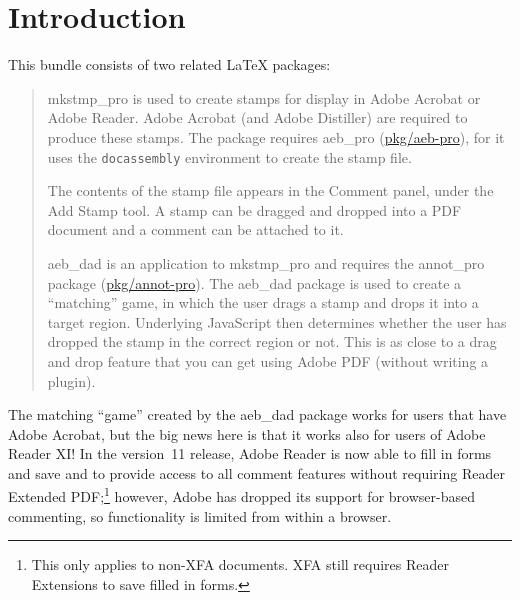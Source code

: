 \documentclass{article}
\def\pkg{\textsf}
\let\app\textsf
\begin{document}
\maketitle

\tableofcontents
{}

\section{Introduction}

This bundle consists of two related {\LaTeX} packages:
\begin{quote}
\begin{description}
    \item \pkg{mkstmp\_pro} is used to create stamps for display in
        \app{Adobe Acrobat} or \app{Adobe Reader}. \app{Adobe Acrobat}
        (and \app{Adobe Distiller}) are required to produce these stamps.
        The package requires \pkg{aeb\_pro}
        (\href{http://ctan.org/pkg/aeb-pro}{pkg/aeb-pro}), for it uses
        the \texttt{docassembly} environment to create the stamp file.

        The contents of the stamp file appears in the
        Comment panel, under the Add Stamp tool. A stamp
        can be dragged and dropped into a PDF document and a comment
        can be attached to it.

    \item \pkg{aeb\_dad} is an application to \pkg{mkstmp\_pro} and
        requires the \pkg{annot\_pro} package
        (\href{http://ctan.org/pkg/annot-pro}{pkg/annot-pro}). The
        \pkg{aeb\_dad} package is used to create a ``matching'' game, in
        which the user drags a stamp and drops it into a target region.
        Underlying JavaScript then determines whether the user has
        dropped the stamp in the correct region or not. This is as close
        to a drag and drop feature that you can get using Adobe PDF
        (without writing a plugin).
\end{description}
\end{quote}
The matching ``game'' created by the \pkg{aeb\_dad} package works for users
that have \app{Adobe Acrobat}, but the big news here is that it works also
for users of \app{Adobe Reader XI}! In the version~11 release, \app{Adobe
Reader} is now able to fill in forms and save and to provide access to all
comment features without requiring Reader Extended PDF;\footnote{This only
applies to non-XFA documents. XFA still requires Reader Extensions to save
filled in forms.} however, Adobe has dropped its support for browser-based
commenting, so functionality is limited from within a browser.
\end{document}
